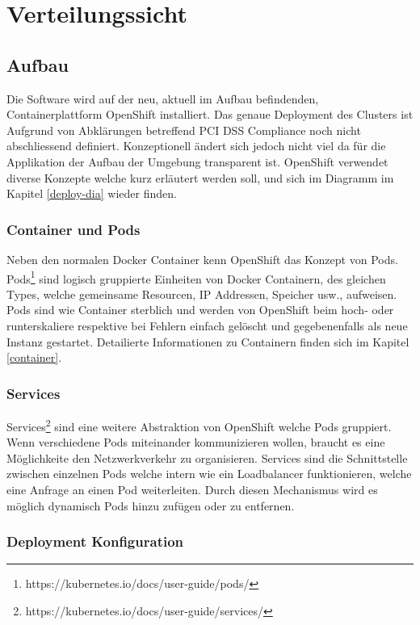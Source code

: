 \graphicspath{{./images/}}

\chapter{Verteilungssicht}
\label{deploy}

\section{Aufbau}
Die Software wird auf der neu, aktuell im Aufbau befindenden, Containerplattform OpenShift installiert. Das genaue Deployment des Clusters ist Aufgrund von Abklärungen betreffend PCI DSS Compliance noch nicht abschliessend definiert. Konzeptionell ändert sich jedoch nicht viel da für die Applikation der Aufbau der Umgebung transparent ist.
OpenShift verwendet diverse Konzepte welche kurz erläutert werden soll, und sich im Diagramm im Kapitel \ref{deploy-dia} wieder finden.

\subsection{Container und Pods}

Neben den normalen Docker Container kenn OpenShift das Konzept von Pods. Pods\footnote{https://kubernetes.io/docs/user-guide/pods/} sind logisch gruppierte Einheiten von Docker Containern, des gleichen Types, welche gemeinsame Resourcen, IP Addressen, Speicher usw.,  aufweisen. Pods sind wie Container sterblich und werden von OpenShift beim hoch- oder runterskaliere respektive bei Fehlern einfach gelöscht und gegebenenfalls als neue Instanz gestartet. Detailierte Informationen zu Containern finden sich im Kapitel \ref{container}.

\subsection{Services}

Services\footnote{https://kubernetes.io/docs/user-guide/services/} sind eine weitere Abstraktion von OpenShift welche Pods gruppiert. Wenn verschiedene Pods miteinander kommunizieren wollen, braucht es eine Möglichkeite den Netzwerkverkehr zu organisieren. Services sind die Schnittstelle zwischen einzelnen Pods welche intern wie ein Loadbalancer funktionieren, welche eine Anfrage an einen Pod weiterleiten. Durch diesen Mechanismus wird es möglich dynamisch Pods hinzu zufügen oder zu entfernen.

\subsection{Deployment Konfiguration}

